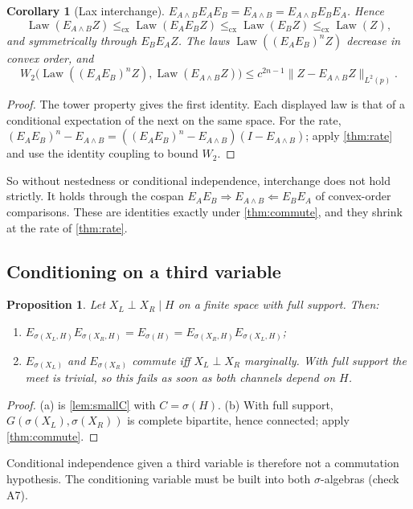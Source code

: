 \documentclass[11pt]{article}
\newtheorem{proposition}[theorem]{Proposition}
\newtheorem{corollary}[theorem]{Corollary}
\theoremstyle{definition}
\newcommand{\cx}{\le_{\mathrm{cx}}}
\newcommand{\Law}{\operatorname{Law}}
\begin{document}
\begin{corollary}[Lax interchange]\label{cor:lax}
$E_{A\wedge B}E_AE_B=E_{A\wedge B}=E_{A\wedge B}E_BE_A$. Hence
\[
\Law(E_{A\wedge B}Z)\cx\Law(E_AE_BZ)\cx\Law(E_BZ)\cx\Law(Z),
\]
and symmetrically through $E_BE_AZ$. The laws $\Law((E_AE_B)^nZ)$ decrease in convex order, and
\[
W_2\big(\Law((E_AE_B)^nZ),\Law(E_{A\wedge B}Z)\big)\le c^{2n-1}\lVert Z-E_{A\wedge B}Z\rVert_{L^2(p)} .
\]
\end{corollary}
\begin{proof}
The tower property gives the first identity. Each displayed law is that of a conditional expectation of the next on the same space.
For the rate, $(E_AE_B)^n-E_{A\wedge B}=((E_AE_B)^n-E_{A\wedge B})(I-E_{A\wedge B})$; apply \cref{thm:rate} and use the identity
coupling to bound $W_2$.
\end{proof}

So without nestedness or conditional independence, interchange does not hold strictly. It holds through the cospan
$E_AE_B\Rightarrow E_{A\wedge B}\Leftarrow E_BE_A$ of convex-order comparisons. These are identities exactly under \cref{thm:commute},
and they shrink at the rate of \cref{thm:rate}.

\subsection{Conditioning on a third variable}
\begin{proposition}\label{prop:gauss}
Let $X_L\perp X_R\mid H$ on a finite space with full support. Then:
\begin{enumerate}[label=(\alph*)]
\item $E_{\sigma(X_L,H)}E_{\sigma(X_R,H)}=E_{\sigma(H)}=E_{\sigma(X_R,H)}E_{\sigma(X_L,H)}$;
\item $E_{\sigma(X_L)}$ and $E_{\sigma(X_R)}$ commute iff $X_L\perp X_R$ marginally. With full support the meet is trivial, so this
  fails as soon as both channels depend on $H$.
\end{enumerate}
\end{proposition}
\begin{proof}
(a) is \cref{lem:smallC} with $C=\sigma(H)$. (b) With full support, $G(\sigma(X_L),\sigma(X_R))$ is complete bipartite, hence
connected; apply \cref{thm:commute}.
\end{proof}

Conditional independence given a third variable is therefore not a commutation hypothesis. The conditioning variable must be built
into both $\sigma$-algebras (check A7).
\end{document}
